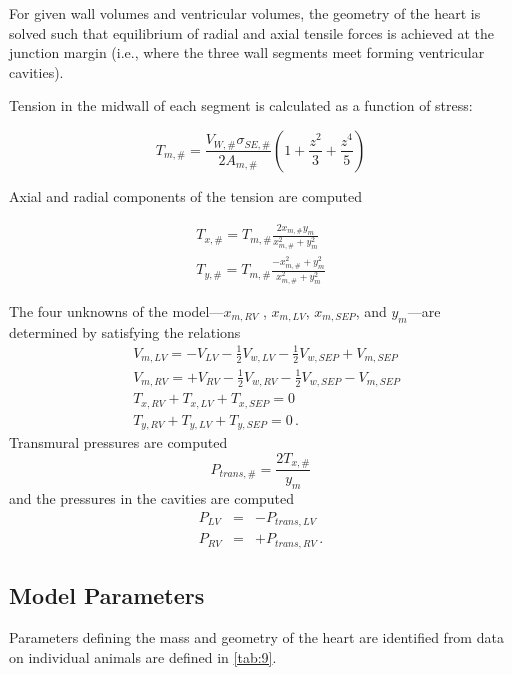 \documentclass[fleqn,10pt]{physiome}
\begin{document}
For given wall volumes and ventricular volumes, the geometry of the heart is solved such that equilibrium of radial and axial tensile forces is achieved at the junction margin (i.e., where the three wall segments meet forming ventricular cavities).

Tension in the midwall of each segment is calculated as a function of stress: 

\begin{equation}
    T_{m,\#} = \frac {V_{W,\#} \sigma_{SE,\#}}{2A_{m,\#}} 
    \left(1+\frac{z^{2}}{3}+\frac{z^{4}}{5}\right)
\end{equation}

Axial and radial components of the tension are computed 

\begin{eqnarray}
 T_{x,\#} = T_{m,\#} \frac{2x_{m,\#}y_{m}}{x_{m,\#}^{2}+y_{m}^{2}} \nonumber \\
 T_{y,\#} = T_{m,\#} \frac{-x_{m,\#}^{2}+y_{m}^{2}}{x_{m,\#}^{2}+y_{m}^{2}}
\end{eqnarray}
   
The four unknowns of the model---$x_{m,RV}$ , $x_{m,LV}$, $x_{m,SEP}$, and $y_{m}$---are determined by satisfying the relations
\begin{eqnarray}
  & V_{m,LV} = -V_{LV} - \frac{1}{2} V_{w,LV} - \frac{1}{2} V_{w,SEP} + V_{m,SEP} \nonumber \\
  & V_{m,RV} = +V_{RV} - \frac{1}{2} V_{w,RV} - \frac{1}{2} V_{w,SEP} - V_{m,SEP} \nonumber \\
  & T_{x,RV} + T_{x,LV} + T_{x,SEP} = 0 \nonumber \\
  & T_{y,RV} + T_{y,LV} + T_{y,SEP} = 0 \nonumber \, .
\end{eqnarray}
Transmural pressures are computed
\begin{equation}
    P_{trans,\#} = \frac{2T_{x,\#}}{y_{m}}
\end{equation}
and the pressures in the cavities are computed
\begin{eqnarray}
P_{LV} &=& - P_{trans,LV} \nonumber \\
P_{RV} &=& + P_{trans,RV} \nonumber \, .
\end{eqnarray}
\subsection{Model Parameters}

Parameters defining the mass and geometry of the heart are identified from data on individual animals are defined in \autoref{tab:9}.
\end{document}
